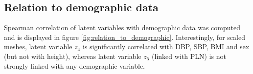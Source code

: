 
\subsection*{Relation to demographic data}
Spearman correlation of latent variables with demographic data was computed and is displayed in figure \ref{fig:relation_to_demographic}.
Interestingly, for scaled meshes, latent variable $z_4$ is significantly correlated with DBP, SBP, BMI and sex (but not with height), whereas latent variable $z_5$ (linked with PLN) is not strongly linked with any demographic variable.

